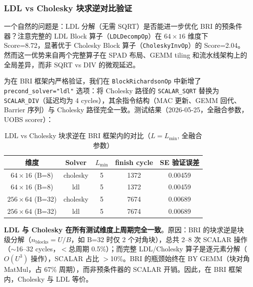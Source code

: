\documentclass{CjC}
\begin{document}
    \subsubsection{LDL vs Cholesky 块求逆对比验证}

    一个自然的问题是：LDL 分解（无需 SQRT）是否能进一步优化 BRI 的预条件器？注意完整的
    LDL Block 算子（\texttt{LDLDecompOp}）在 $64\times16$ 维度下 Score=8.72，显著优于
    Cholesky Block 算子（\texttt{CholeskyInvOp}）的 Score=2.04。然而这一优势来自两个完整算子在
    SPAD 布局、GEMM tiling 和流水线架构上的全局差异，而非 SQRT vs DIV 的微观延迟。

    为在 BRI 框架内严格验证，我们在 \texttt{BlockRichardsonOp} 中新增了 \texttt{precond\_solver="ldl"}
    选项：将 Cholesky 路径的 \texttt{SCALAR\_SQRT} 替换为 \texttt{SCALAR\_DIV}（延迟均为
    4 cycles），其余指令结构（MAC 更新、GEMM 回代、Barrier 序列）与 Cholesky 路径完全一致。测试结果（2026-05-25，全融合参数，UOBS
    scorer）：

    \begin{table}[H]
        \centering
        \caption{LDL vs Cholesky 块求逆在 BRI 框架内的对比（$L=L_{\min}$,
        全融合参数）}
        \begin{tabular}{c c c c c}
            \toprule 维度                   & Solver   & $L_{\min}$ & finish cycle & SE 验证误差 \\
            \midrule $64\times16$ (B=8)   & cholesky & 5          & 1372         & 0.00459    \\
            $64\times16$ (B=8)            & ldl      & 5          & 1372         & 0.00459    \\
            \midrule $256\times64$ (B=32) & cholesky & 5          & 7674         & 0.00689    \\
            $256\times64$ (B=32)          & ldl      & 5          & 7674         & 0.00689    \\
            \bottomrule
        \end{tabular}
    \end{table}

    \textbf{LDL 与 Cholesky 在所有测试维度上周期完全一致}。原因：BRI 的块求逆是块级分解（$n
    _{\text{blocks}}=U/B$，如 B=32 时仅 2 个对角块），总共 2--8 次 SCALAR 操作（$\sim$16--32
    cycles，$<$总周期 0.5\%）；而完整 LDL/Cholesky 算子是逐元素分解（$O(U^{3})$
    操作），SCALAR 占比 $>$10\%。BRI 的瓶颈始终在 BY GEMM（块对角 MatMul，占 67\%
    周期），而非预条件器的 SCALAR 开销。因此，在 BRI 框架内，Cholesky 与 LDL
    等价。
\end{document}

